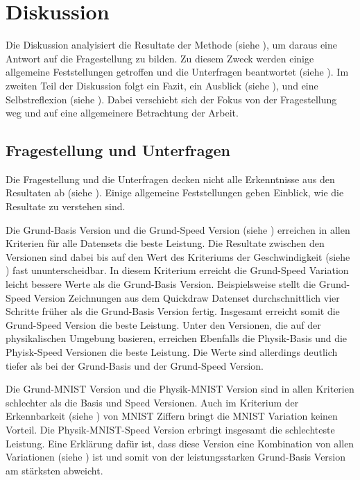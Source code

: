 \chapter{Diskussion}\label{chap:d}
Die Diskussion analyisiert die Resultate der Methode (siehe ),
um daraus eine Antwort auf die Fragestellung zu bilden. Zu diesem Zweck werden
einige allgemeine Feststellungen getroffen und die Unterfragen beantwortet
(siehe ). Im zweiten Teil der Diskussion folgt ein Fazit,
ein Ausblick (siehe ), und eine Selbstreflexion (siehe
). Dabei verschiebt sich der Fokus von der Fragestellung
weg und auf eine allgemeinere Betrachtung der Arbeit.


\section{Fragestellung und Unterfragen}\label{chap:d_frage}
Die Fragestellung und die Unterfragen decken nicht alle Erkenntnisse aus den
Resultaten ab (siehe ). Einige allgemeine Feststellungen geben
Einblick, wie die Resultate  zu verstehen sind. 

Die Grund-Basis Version und die Grund-Speed Version (siehe
) erreichen in allen Kriterien für alle Datensets die
beste Leistung. Die Resultate zwischen den Versionen sind dabei bis auf den Wert
des Kriteriums der Geschwindigkeit (siehe ) fast
ununterscheidbar. In diesem Kriterium erreicht die Grund-Speed Variation leicht
bessere Werte als die Grund-Basis Version. Beispielsweise stellt die Grund-Speed
Version Zeichnungen aus dem Quickdraw Datenset durchschnittlich vier Schritte
früher als die Grund-Basis Version fertig. Insgesamt erreicht somit die
Grund-Speed Version die beste Leistung. Unter den Versionen, die auf der
physikalischen Umgebung basieren, erreichen Ebenfalls die Physik-Basis und die
Phyisk-Speed Versionen die beste Leistung. Die Werte sind allerdings deutlich
tiefer als bei der Grund-Basis und der Grund-Speed Version.

Die Grund-MNIST Version und die Physik-MNIST Version sind in allen Kriterien
schlechter als die Basis und Speed Versionen. Auch im Kriterium der
Erkennbarkeit (siehe ) von MNIST Ziffern bringt die
MNIST Variation keinen Vorteil. Die Physik-MNIST-Speed Version erbringt
insgesamt die schlechteste Leistung. Eine Erklärung dafür ist, dass diese
Version eine Kombination von allen Variationen (siehe )
ist und somit von der leistungsstarken Grund-Basis Version am stärksten
abweicht.


